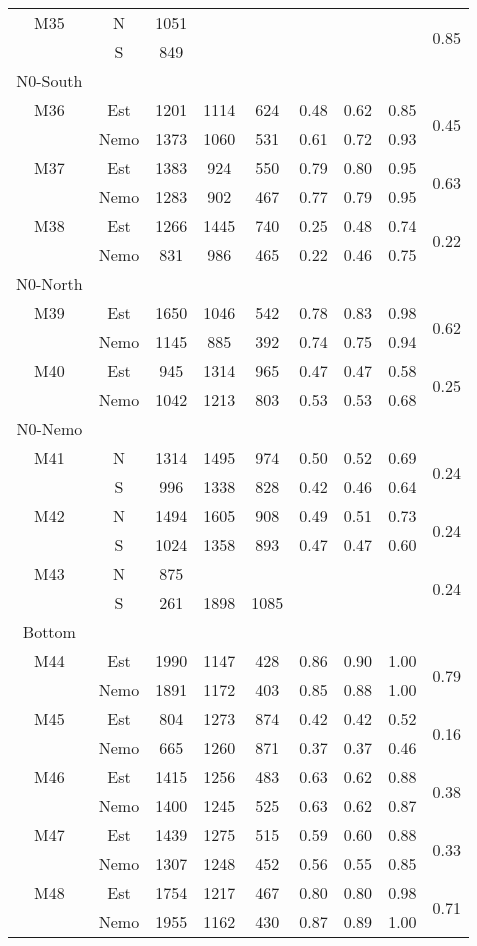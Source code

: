 \begin{longtable}{c c c c c c c c c}
  M35 & N & 1051 &  &  &  &  &  & \multirow{2}{*}{0.85} \\
      & S & 849 &  &  &  &  & & \\
  \midrule
  N0-South\\
  \midrule
  M36 & Est & 1201 & 1114 & 624 & 0.48 & 0.62 & 0.85 & \multirow{2}{*}{0.45}\\
      & Nemo & 1373 & 1060 & 531 & 0.61 & 0.72 & 0.93 & \\
  M37 & Est & 1383 & 924 & 550 & 0.79 & 0.80 & 0.95 & \multirow{2}{*}{0.63}\\
      & Nemo & 1283 & 902 & 467 & 0.77 & 0.79 & 0.95 & \\
  M38 & Est & 1266 & 1445 & 740 & 0.25 & 0.48 & 0.74 & \multirow{2}{*}{0.22}\\
      & Nemo & 831 & 986 & 465 & 0.22 & 0.46 & 0.75 & \\
  \midrule
  N0-North\\
  \midrule
  M39 & Est & 1650 & 1046 & 542 & 0.78 & 0.83 & 0.98 & \multirow{2}{*}{0.62} \\
      & Nemo & 1145 & 885 & 392 & 0.74 & 0.75 & 0.94 & \\
  M40 & Est & 945 & 1314 & 965 & 0.47 & 0.47 & 0.58 & \multirow{2}{*}{0.25} \\
      & Nemo & 1042 & 1213 & 803 & 0.53 & 0.53 & 0.68 & \\
  \midrule
  N0-Nemo\\
  \midrule
  M41 & N & 1314 & 1495 & 974 & 0.50 & 0.52 & 0.69 & \multirow{2}{*}{0.24} \\
      & S & 996 & 1338 & 828 & 0.42 & 0.46 & 0.64 & \\
  M42 & N & 1494 & 1605 & 908 & 0.49 & 0.51 & 0.73 & \multirow{2}{*}{0.24} \\
      & S & 1024 & 1358 & 893 & 0.47 & 0.47 & 0.60 & \\
  M43 & N & 875 &  &  &   &   &   & \multirow{2}{*}{0.24} \\
      & S & 261 & 1898 & 1085 &   &   &  & \\
  \midrule
  Bottom\\
  \midrule
  M44 & Est & 1990 & 1147 & 428 & 0.86 & 0.90 & 1.00 & \multirow{2}{*}{0.79}\\
   & Nemo & 1891 & 1172 & 403 & 0.85 & 0.88 & 1.00 & \\
  M45 & Est & 804 & 1273 & 874 & 0.42 & 0.42 & 0.52 & \multirow{2}{*}{0.16}\\
   & Nemo & 665 & 1260 & 871 & 0.37 & 0.37 & 0.46 & \\
  M46 & Est & 1415 & 1256 & 483 & 0.63 & 0.62 & 0.88 & \multirow{2}{*}{0.38}\\
   & Nemo & 1400 & 1245 & 525 & 0.63 & 0.62 & 0.87 & \\
  M47 & Est & 1439 & 1275 & 515 & 0.59 & 0.60 & 0.88 & \multirow{2}{*}{0.33}\\
   & Nemo & 1307 & 1248 & 452 & 0.56 & 0.55 & 0.85 & \\
  M48 & Est & 1754 & 1217 & 467 & 0.80 & 0.80 & 0.98 & \multirow{2}{*}{0.71}\\
   & Nemo & 1955 & 1162 & 430 & 0.87 & 0.89 & 1.00 & \\

  \bottomrule
\end{longtable}

\normalsize
